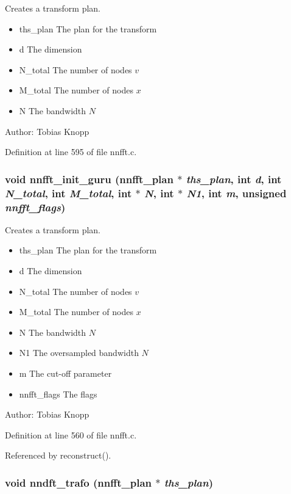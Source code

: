 Creates a transform plan. 

\begin{itemize}
\item ths\_\-plan The plan for the transform \item d The dimension \item N\_\-total The number of nodes $v$ \item M\_\-total The number of nodes $x$ \item N The bandwidth $N$\end{itemize}
\begin{Desc}
\item[Author:]Tobias Knopp \end{Desc}


Definition at line 595 of file nnfft.c.\hypertarget{group__nnfft_g75a2cb786f4cc4c87082c87a2c32046a}{
\subsubsection{\setlength{\rightskip}{0pt plus 5cm}void nnfft\_\-init\_\-guru ({\bf nnfft\_\-plan} $\ast$ {\em ths\_\-plan}, int {\em d}, int {\em N\_\-total}, int {\em M\_\-total}, int $\ast$ {\em N}, int $\ast$ {\em N1}, int {\em m}, unsigned {\em nnfft\_\-flags})}}
\label{group__nnfft_g75a2cb786f4cc4c87082c87a2c32046a}


Creates a transform plan. 

\begin{itemize}
\item ths\_\-plan The plan for the transform \item d The dimension \item N\_\-total The number of nodes $v$ \item M\_\-total The number of nodes $x$ \item N The bandwidth $N$ \item N1 The oversampled bandwidth $N$ \item m The cut-off parameter \item nnfft\_\-flags The flags\end{itemize}
\begin{Desc}
\item[Author:]Tobias Knopp \end{Desc}


Definition at line 560 of file nnfft.c.

Referenced by reconstruct().\hypertarget{group__nnfft_g9c7b1467a923e54c20f231738e0078b8}{
\subsubsection{\setlength{\rightskip}{0pt plus 5cm}void nndft\_\-trafo ({\bf nnfft\_\-plan} $\ast$ {\em ths\_\-plan})}}
\label{group__nnfft_g9c7b1467a923e54c20f231738e0078b8}


